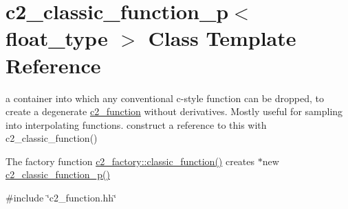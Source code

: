 \hypertarget{classc2__classic__function__p}{}\section{c2\+\_\+classic\+\_\+function\+\_\+p$<$ float\+\_\+type $>$ Class Template Reference}
\label{classc2__classic__function__p}


a container into which any conventional c-\/style function can be dropped, to create a degenerate \hyperlink{classc2__function}{c2\+\_\+function} without derivatives. Mostly useful for sampling into interpolating functions. construct a reference to this with c2\+\_\+classic\+\_\+function()

The factory function \hyperlink{classc2__factory_ae5c9140b2bfcc6416682562b99479974}{c2\+\_\+factory\+::classic\+\_\+function()} creates $\ast$new \hyperlink{classc2__classic__function__p_a8b2d09d67a8835902fd6c684d5b183b7}{c2\+\_\+classic\+\_\+function\+\_\+p()}  




{\ttfamily \#include \char`\"{}c2\+\_\+function.\+hh\char`\"{}}



